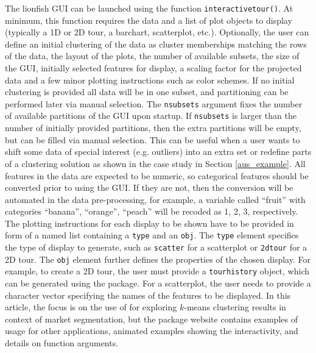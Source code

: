 \documentclass[article]{ajs}
\begin{document}
The lionfish GUI can be launched using the function \texttt{interactive\textunderscore tour()}. At minimum, this function requires the data and a list of plot objects to display (typically a 1D or 2D tour, a barchart, scatterplot, etc.). Optionally, the user can define an initial clustering of the data as cluster memberships matching the rows of the data, the layout of the plots, the number of available subsets, the size of the GUI, initially selected features for display, a scaling factor for the projected data and a few minor plotting instructions such as color schemes. If no initial clustering is provided all data will be in one subset, and partitioning can be performed later via manual selection. The \texttt{n\textunderscore subsets} argument fixes the number of available partitions of the GUI upon startup. If \texttt{n\textunderscore subsets} is larger than the number of initially provided partitions, then the extra partitions will be empty, but can be filled via manual selection. This can be useful when a user wants to shift some data of special interest (e.g. outliers) into an extra set or redefine parts of a clustering solution as shown in the case study in Section \ref{aus_example}. All features in the data are expected to be numeric, so categorical features should be converted prior to using the GUI. If they are not, then the conversion will be automated in the data pre-processing, for example, a variable called ``fruit'' with categories ``banana'', ``orange'',  ``peach'' will be recoded as 1, 2, 3, respectively. The plotting instructions for each display to be shown have to be provided in form of a named list containing a \texttt{type} and an \texttt{obj}. The \texttt{type} element specifies the type of display to generate, such as \texttt{scatter} for a scatterplot or \texttt{2d\textunderscore tour} for a 2D tour. The \texttt{obj} element further defines the properties of the chosen display.  For example, to create a 2D tour, the user must provide a \texttt{tour\textunderscore history} object, which can be generated using the  package. For a scatterplot, the user needs to provide a character vector specifying the names of the features to be displayed. In this article, the focus is on the use of  for exploring $k$-means clustering results in context of market segmentation, but the package website contains examples of usage for other applications, animated examples showing the interactivity, and details on function arguments.
\end{document}
